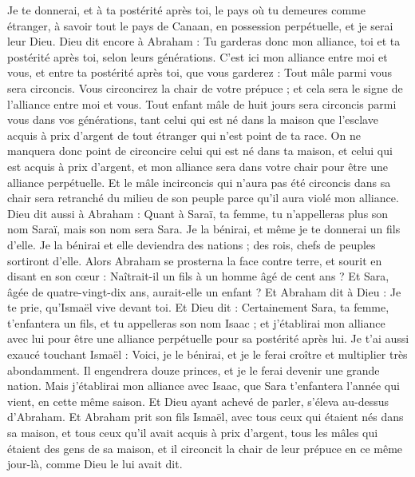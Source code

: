 \begin{multicols}{2}
Je te donnerai, et à ta postérité après toi, le pays où tu demeures comme étranger, à savoir tout le pays de Canaan, en possession perpétuelle, et je serai leur Dieu.
Dieu dit encore à Abraham : Tu garderas donc mon alliance, toi et ta postérité après toi, selon leurs générations.
C’est ici mon alliance entre moi et vous, et entre ta postérité après toi, que vous garderez : Tout mâle parmi vous sera circoncis.
Vous circoncirez la chair de votre prépuce ; et cela sera le signe de l'alliance entre moi et vous.
Tout enfant mâle de huit jours sera circoncis parmi vous dans vos générations, tant celui qui est né dans la maison que l'esclave acquis à prix d’argent de tout étranger qui n'est point de ta race.
On ne manquera donc point de circoncire celui qui est né dans ta maison, et celui qui est acquis à prix d’argent, et mon alliance sera dans votre chair pour être une alliance perpétuelle.
Et le mâle incirconcis qui n’aura pas été circoncis dans sa  chair sera retranché du milieu de son peuple parce qu'il aura violé mon alliance.
Dieu dit aussi à Abraham : Quant à Saraï, ta femme, tu n'appelleras plus son nom Saraï, mais son nom sera Sara.
Je la bénirai, et même je te donnerai un fils d'elle. Je la bénirai et elle deviendra des nations ; des rois, chefs de peuples sortiront d'elle.
Alors Abraham se prosterna la face contre terre, et sourit en disant en son cœur : Naîtrait-il un fils à un homme âgé de cent ans ? Et Sara, âgée de quatre-vingt-dix ans, aurait-elle un enfant ?
Et Abraham dit à Dieu : Je te prie, qu'Ismaël vive devant toi.
Et Dieu dit : Certainement Sara, ta femme, t'enfantera un fils, et tu appelleras son nom Isaac ; et j'établirai mon alliance avec lui pour être une alliance perpétuelle pour sa postérité après lui.
Je t'ai aussi exaucé touchant Ismaël : Voici, je le bénirai, et je le ferai croître et multiplier très abondamment. Il engendrera douze princes, et je le ferai devenir une grande nation.
Mais j'établirai mon alliance avec Isaac, que Sara t'enfantera l'année qui vient, en cette même saison.
Et Dieu ayant achevé de parler, s’éleva au-dessus d'Abraham.
Et Abraham prit son fils Ismaël, avec tous ceux qui étaient nés dans sa maison, et tous ceux qu'il avait acquis à prix d’argent, tous les mâles qui étaient des gens de sa maison, et il circoncit la chair de leur prépuce en ce même jour-là, comme Dieu le lui avait dit.

\end{multicols}

